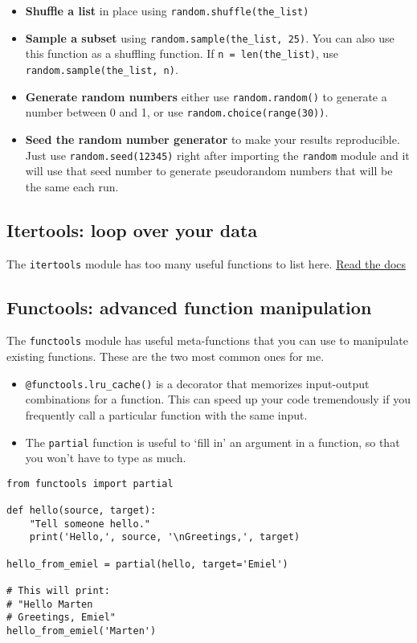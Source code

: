 \documentclass[12pt]{book}
\begin{document}
\begin{itemize}
\item \textbf{Shuffle a list} in place using \texttt{random.shuffle(the\_list)}
\item \textbf{Sample a subset} using \texttt{random.sample(the\_list,\ 25)}. You can also use this function as a shuffling function. If \texttt{n\ =\ len(the\_list)}, use \texttt{random.sample(the\_list,\ n)}.
\item \textbf{Generate random numbers} either use \texttt{random.random()} to generate a number between 0 and 1, or use \texttt{random.choice(range(30))}.
\item \textbf{Seed the random number generator} to make your results reproducible. Just use \texttt{random.seed(12345)} right after importing the \texttt{random} module and it will use that seed number to generate pseudorandom numbers that will be the same each run.
\end{itemize}

\subsection{Itertools: loop over your data}

The \texttt{itertools} module has too many useful functions to list here. \href{https://docs.python.org/3/library/itertools.html}{Read the docs}

\subsection{Functools: advanced function manipulation}

The \texttt{functools} module has useful meta-functions that you can use
to manipulate existing functions. These are the two most common ones for
me.

\begin{itemize}
\item \texttt{@functools.lru\_cache()} is a decorator that memorizes
  input-output combinations for a function. This can speed up your code
  tremendously if you frequently call a particular function with the
  same input.
\item The \texttt{partial} function is useful to `fill in' an argument in a
  function, so that you won't have to type as much.
\end{itemize}

\begin{lstlisting}
from functools import partial

def hello(source, target):
    "Tell someone hello."
    print('Hello,', source, '\nGreetings,', target)
    
hello_from_emiel = partial(hello, target='Emiel')

# This will print:
# "Hello Marten
# Greetings, Emiel"
hello_from_emiel('Marten')
\end{lstlisting}
\end{document}
